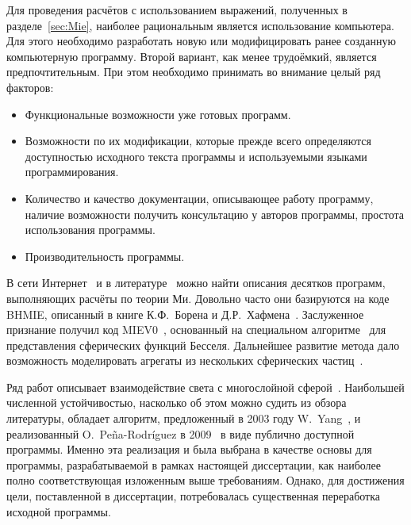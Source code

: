 
Для проведения расчётов с использованием выражений, полученных в
разделе~\ref{sec:Mie}, наиболее рациональным является использование
компьютера.  Для этого необходимо разработать новую или модифицировать
ранее созданную компьютерную программу. Второй вариант, как менее
трудоёмкий, является предпочтительным.  При этом необходимо принимать
во внимание целый ряд факторов:
\begin{itemize}
\item Функциональные возможности уже готовых программ.
\item Возможности по их модификации, которые прежде всего определяются
  доступностью исходного текста программы и используемыми языками программирования.
\item Количество и качество документации, описывающее работу
  программу, наличие возможности получить консультацию у авторов
  программы, простота использования программы.
\item Производительность программы.
\end{itemize}

В сети Интернет~\cite{scattport,wiki-mie-codes} и в
литературе~\cite{Wriedt-2009} можно найти описания десятков программ,
выполняющих расчёты по теории Ми.  Довольно часто они базируются на
коде BHMIE, описанный в книге К.Ф.~Борена и Д.Р.~Хафмена~\cite{Bohren-1983}.  Заслуженное признание получил код
MIEV0~\cite{Wiscombe-1980}, основанный на специальном
алгоритме~\cite{Lentz-76} для представления сферических функций
Бесселя. Дальнейшее развитие метода дало возможность моделировать
агрегаты из нескольких сферических частиц~\cite{Mackowski-96,Xu-95}.

Ряд работ описывает взаимодействие света с многослойной
сферой~\cite{Kai-94,Wu-97, Bhandari-85}.  Наибольшей численной
устойчивостью, насколько об этом можно судить из обзора литературы,
обладает алгоритм, предложенный в 2003 году W.~Yang~\cite{Yang-2003},
и реализованный O.~Pe\~{n}a-Rodr\'{i}guez в
2009~\cite{Pena-scattnlay-2009} в виде публично доступной программы.
Именно эта реализация и была выбрана в качестве основы для программы,
разрабатываемой в рамках настоящей диссертации, как наиболее полно
соответствующая изложенным выше требованиям.  Однако, для достижения
цели, поставленной в диссертации, потребовалась существенная
переработка исходной программы.

